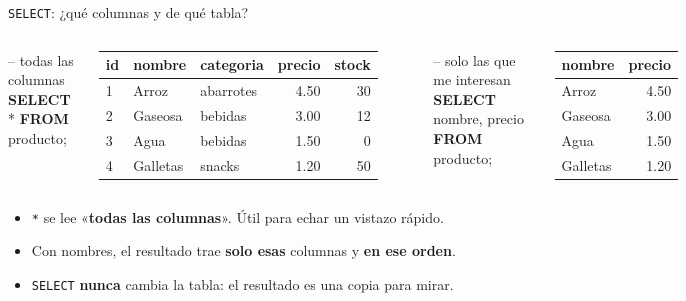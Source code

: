 \documentclass[aspectratio=169,10pt,c]{beamer}
\newcommand{\kw}[1]{\textcolor{utpRojo}{\textbf{#1}}}
\newcommand{\nuevo}[1]{{%
  \setlength{\fboxsep}{1.2pt}%
  \begingroup
  \renewcommand{\kw}[1]{\textcolor{utpNegro}{\textbf{##1}}}%
  \colorbox{yellow!45}{\textcolor{utpNegro}{#1}}%
  \endgroup}}
\newcommand{\com}[1]{\textcolor{utpGris}{-- #1}}
\newenvironment{sqlcode}[1][.86\textwidth]
  {\begin{center}\begin{lrbox}{\sqlbuf}\begin{minipage}{#1}\ttfamily\footnotesize\vspace{6pt}\raggedright}
  {\vspace{6pt}\end{minipage}\end{lrbox}\colorbox{utpGrisClaro}{\usebox{\sqlbuf}}\end{center}}
\newcommand{\cabproducto}{%
  \normalfont\bfseries id & \normalfont\bfseries nombre & \normalfont\bfseries categoria
  & \normalfont\bfseries precio & \normalfont\bfseries stock \\}
\begin{document}
\begin{frame}{\texttt{SELECT}: ¿qué columnas y de qué tabla?}
\begin{columns}[T,onlytextwidth]
\begin{sqlcode}[\textwidth]
\com{todas las columnas}\\
\kw{SELECT} \nuevo{*} \kw{FROM} producto;
\end{sqlcode}
\vspace{-0.2cm}
\centering\scriptsize\ttfamily
\begin{tabular}{lllrr}
\toprule
\cabproducto
\midrule
1 & Arroz & abarrotes & 4.50 & 30 \\
2 & Gaseosa & bebidas & 3.00 & 12 \\
3 & Agua & bebidas & 1.50 & 0 \\
4 & Galletas & snacks & 1.20 & 50 \\
\bottomrule
\end{tabular}
\begin{sqlcode}[\textwidth]
\com{solo las que me interesan}\\
\kw{SELECT} \nuevo{nombre, precio} \kw{FROM} producto;
\end{sqlcode}
\vspace{-0.2cm}
\centering\scriptsize\ttfamily
\begin{tabular}{lr}
\toprule
\normalfont\bfseries nombre & \normalfont\bfseries precio \\
\midrule
Arroz & 4.50 \\
Gaseosa & 3.00 \\
Agua & 1.50 \\
Galletas & 1.20 \\
\bottomrule
\end{tabular}
\end{columns}
\vspace{0.4cm}
\small
\begin{itemize}\setlength\itemsep{4pt}
  \item \texttt{*} se lee «\textbf{todas las columnas}». Útil para echar un vistazo rápido.
  \item Con nombres, el resultado trae \textbf{solo esas} columnas y \textbf{en ese orden}.
  \item \texttt{SELECT} \textbf{nunca} cambia la tabla: el resultado es una copia para mirar.
\end{itemize}
\end{frame}
\end{document}
